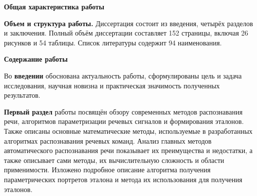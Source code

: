 \begin{center}
{\fontsize{11}{13}\selectfont \textbf{Общая характеристика работы}}
\end{center}

\newcommand{\actuality}{\underline{\textbf{\actualityTXT}}}
\newcommand{\progress}{\underline{\textbf{\progressTXT}}}
\newcommand{\aim}{\underline{{\textbf\aimTXT}}}
\newcommand{\tasks}{\underline{\textbf{\tasksTXT}}}
\newcommand{\novelty}{\underline{\textbf{\noveltyTXT}}}
\newcommand{\influence}{\underline{\textbf{\influenceTXT}}}
\newcommand{\methods}{\underline{\textbf{\methodsTXT}}}
\newcommand{\defpositions}{\underline{\textbf{\defpositionsTXT}}}
\newcommand{\reliability}{\underline{\textbf{\reliabilityTXT}}}
\newcommand{\probation}{\underline{\textbf{\probationTXT}}}
\newcommand{\contribution}{\underline{\textbf{\contributionTXT}}}
\newcommand{\publications}{\underline{\textbf{\publicationsTXT}}}



\textbf{Объем и структура работы.} Диссертация состоит из введения, четырёх разделов и заключения. Полный объём диссертации составляет 152 страницы, включая 26 рисунков и 54 таблицы. Список литературы содержит 94 наименования.

\begin{center}
	{\fontsize{11}{13}\selectfont \textbf{Содержание работы} \vspace{-1.5ex}}
\end{center}

Во \textbf{введении} обоснована актуальность работы, сформулированы цель и задача исследования, научная новизна и практическая значимость полученных результатов.

\textbf{Первый раздел} работы посвящён обзору современных методов распознавания речи, алгоритмов параметризации речевых сигналов и формирования эталонов.
Также описаны основные математические методы, используемые в разработанных алгоритмах распознавания речевых команд.
Анализ главных методов автоматического распознавания речи показывает их преимущества и недостатки, а также описывает сами методы, их вычислительную сложность и области применимости.
Изложено подробное описание алгоритма получения параметрических портретов эталона и метода их использования для получения эталонов.

